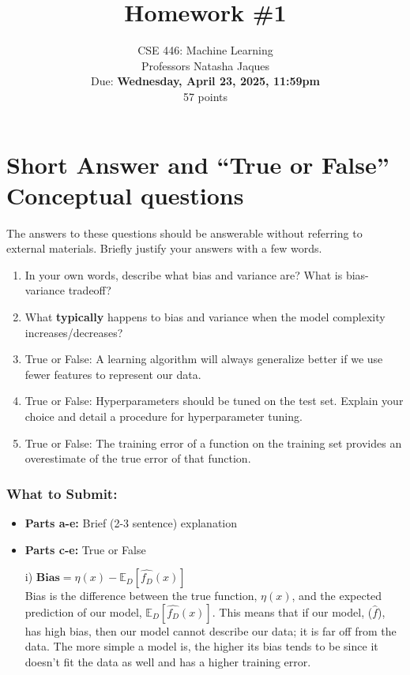 \documentclass{article}
\begin{document}
\setcounter{aprob}{0}
\title{Homework \#1}
\author{
    \normalsize{CSE 446: Machine Learning}\\
    \normalsize{Professors Natasha Jaques}\\
    \normalsize{Due: \textbf{Wednesday, April 23, 2025, 11:59pm}}\\
    \normalsize{57 points}
}
\date{{}}
\maketitle
\section*{Short Answer and ``True or False'' Conceptual questions}
\begin{aprob}
    The answers to these questions should be answerable without referring to external materials.  Briefly justify your answers with a few words.
    \begin{enumerate}
        \item{} In your own words, describe what bias and variance are? What is bias-variance tradeoff?
        \item {} What \textbf{typically} happens to bias and variance when the model complexity increases/decreases?
        \item {} True or False: A learning algorithm will always generalize better if we use fewer features to represent our data. 
        \item {} True or False: Hyperparameters should be tuned on the test set. Explain your choice and detail a procedure for hyperparameter tuning.
        \item {} True or False: The training error of a function on the training set provides an overestimate of the true error of that function.
    \end{enumerate}
    \subsubsection*{What to Submit:}
    \begin{itemize}
        \item \textbf{Parts a-e:} Brief (2-3 sentence) explanation
        \item \textbf{Parts c-e:} True or False
    \end{itemize}
    \begin{tcolorbox}[colback=lightgray!10!white, colframe=black, title=A1.a]
        \begin{enumerate}
            \item[i)] $\textbf{Bias} = \eta(x) - \mathbb{E}_D[\hat{f_D}(x)]$ \\
            Bias is the difference between the true function, \( \eta(x) \), and the expected prediction of our
            model, \( \mathbb{E}_D[\hat{f_D}(x)] \). This means that if our model, ($\hat{f}$), has high bias, then our model cannot describe our data; it is far off from the data.
            The more simple a model is, the higher its bias tends to be since it doesn’t fit the data as well and has a higher training error.
    

\end{enumerate}
\end{tcolorbox}
\end{aprob}
\end{document}

